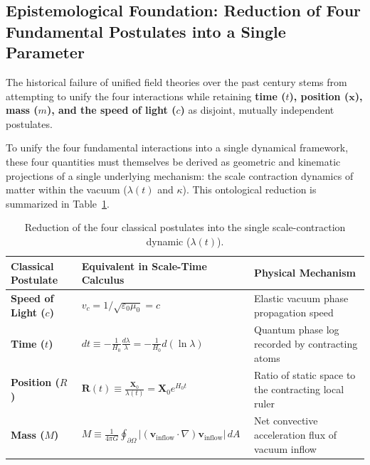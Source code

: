 \subsection{Epistemological Foundation: Reduction of Four Fundamental Postulates into a Single Parameter}
\label{sec:postulatlarin_eritilmesi_sentez}

The historical failure of unified field theories over the past century stems from attempting to unify the four interactions while retaining \textbf{time ($t$), position ($\mathbf{x}$), mass ($m$), and the speed of light ($c$)} as disjoint, mutually independent postulates.

To unify the four fundamental interactions into a single dynamical framework, these four quantities must themselves be derived as geometric and kinematic projections of a single underlying mechanism: the scale contraction dynamics of matter within the vacuum ($\lambda(t)$ and $\kappa$). This ontological reduction is summarized in Table~\ref{tab:ontolojik_indirgeme_sentez}.

\begin{table}[h!]
    \centering
    \small
    \begin{tabular}{@{}lll@{}}
        \toprule
        \textbf{Classical Postulate} & \textbf{Equivalent in Scale-Time Calculus}                                                                         & \textbf{Physical Mechanism}                              \\ \midrule
        \textbf{Speed of Light ($c$)} & $v_c = 1/\sqrt{\varepsilon_0\mu_0} = c$                                                                            & Elastic vacuum phase propagation speed                   \\
        \textbf{Time ($t$)}           & $dt \equiv -\frac{1}{H_0} \frac{d\lambda}{\lambda} = -\frac{1}{H_0} d(\ln\lambda)$                                 & Quantum phase log recorded by contracting atoms          \\
        \textbf{Position ($R$)}       & $\mathbf{R}(t) \equiv \frac{\mathbf{X}_0}{\lambda(t)} = \mathbf{X}_0 e^{H_0 t}$                                    & Ratio of static space to the contracting local ruler     \\
        \textbf{Mass ($M$)}           & $M \equiv \frac{1}{4\pi G} \oint_{\partial \Omega} |(\mathbf{v}_{\mathrm{inflow}}\cdot\nabla)\mathbf{v}_{\mathrm{inflow}}| \, dA$ & Net convective acceleration flux of vacuum inflow        \\ \bottomrule
    \end{tabular}
    \caption{Reduction of the four classical postulates into the single scale-contraction dynamic ($\lambda(t)$).}
    \label{tab:ontolojik_indirgeme_sentez}
\end{table}

